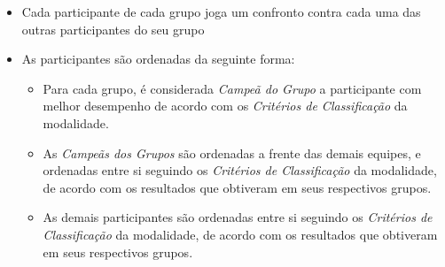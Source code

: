 \begin{itemize}[noitemsep]
	\item Cada participante de cada grupo joga um confronto contra cada uma das outras participantes do seu grupo
	\item As participantes são ordenadas da seguinte forma:
	\begin{itemize}[noitemsep]
		\item Para cada grupo, é considerada \textit{Campeã do Grupo} a participante com melhor desempenho de acordo com os \textit{Critérios de Classificação} da modalidade.
		\item As \textit{Campeãs dos Grupos} são ordenadas a frente das demais equipes, e ordenadas entre si seguindo os \textit{Critérios de Classificação} da modalidade, de acordo com os resultados que obtiveram em seus respectivos grupos.
		\item As demais participantes são ordenadas entre si seguindo os \textit{Critérios de Classificação} da modalidade, de acordo com os resultados que obtiveram em seus respectivos grupos.
	\end{itemize}
\end{itemize}

